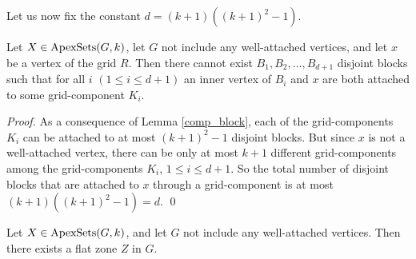 \documentclass{llncs}
\begin{document}
Let us now fix the constant $d=(k+1)((k+1)^2-1)$.

\begin{lemma}
\label{comp_block2}
Let $X \in \textup{ApexSets}(G,k)$, let $G$ not include any well-attached vertices,
and let $x$ be a vertex of the grid $R$.
Then there cannot exist $B_1, B_2, \dots, B_{d+1}$ disjoint blocks such that for all $i$
$( 1 \leq i \leq d+1)$ an inner vertex of $B_i$ and $x$ are both attached to
some grid-component $K_i$.
\end{lemma}

\begin{proof}
As a consequence of Lemma \ref{comp_block}, each of the grid-components $K_i$
can be attached to at most $(k+1)^2-1$ disjoint blocks.
But since $x$ is not a well-attached vertex, there can be only at most
$k+1$ different grid-components among the grid-components $K_i$, $1 \leq i \leq d+1$.
So the total number of disjoint blocks that are
attached to $x$ through a grid-component is at most $(k+1)((k+1)^2-1)=d$.
\qed
\end{proof}

\begin{lemma}
\label{zones}
Let $X \in \textup{ApexSets}(G,k)$, and let $G$ not include any well-attached vertices.
Then there exists a flat zone $Z$ in $G$.
\end{lemma}
\end{document}
